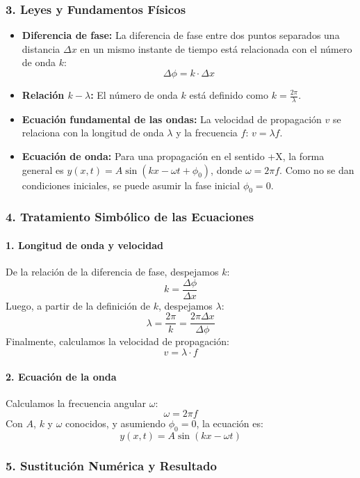 \subsubsection*{3. Leyes y Fundamentos Físicos}
\begin{itemize}
    \item \textbf{Diferencia de fase:} La diferencia de fase entre dos puntos separados una distancia $\Delta x$ en un mismo instante de tiempo está relacionada con el número de onda $k$:
    $$ \Delta\phi = k \cdot \Delta x $$
    \item \textbf{Relación $k-\lambda$:} El número de onda $k$ está definido como $k = \frac{2\pi}{\lambda}$.
    \item \textbf{Ecuación fundamental de las ondas:} La velocidad de propagación $v$ se relaciona con la longitud de onda $\lambda$ y la frecuencia $f$: $v = \lambda f$.
    \item \textbf{Ecuación de onda:} Para una propagación en el sentido +X, la forma general es $y(x,t) = A\sin(kx - \omega t + \phi_0)$, donde $\omega=2\pi f$. Como no se dan condiciones iniciales, se puede asumir la fase inicial $\phi_0=0$.
\end{itemize}

\subsubsection*{4. Tratamiento Simbólico de las Ecuaciones}
\paragraph{1. Longitud de onda y velocidad}
De la relación de la diferencia de fase, despejamos $k$:
$$ k = \frac{\Delta\phi}{\Delta x} $$
Luego, a partir de la definición de $k$, despejamos $\lambda$:
$$ \lambda = \frac{2\pi}{k} = \frac{2\pi \Delta x}{\Delta\phi} $$
Finalmente, calculamos la velocidad de propagación:
$$ v = \lambda \cdot f $$
\paragraph{2. Ecuación de la onda}
Calculamos la frecuencia angular $\omega$:
$$ \omega = 2\pi f $$
Con $A$, $k$ y $\omega$ conocidos, y asumiendo $\phi_0 = 0$, la ecuación es:
$$ y(x,t) = A\sin(kx - \omega t) $$

\subsubsection*{5. Sustitución Numérica y Resultado}
